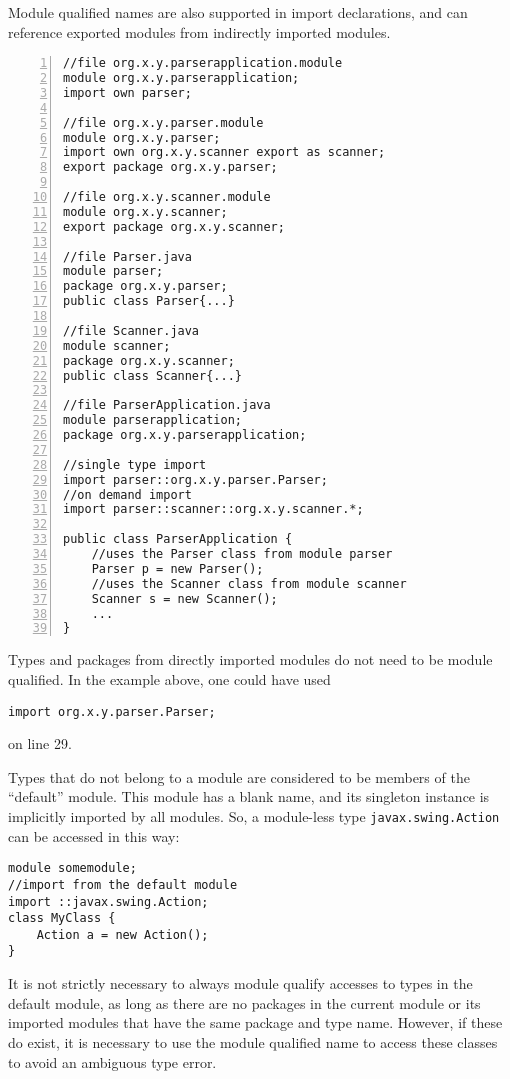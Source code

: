 Module qualified names are also supported in import declarations,
and can reference exported modules from indirectly imported modules.

\begin{lstlisting}[caption=Module Qualified Imports,numbers=left]
//file org.x.y.parserapplication.module
module org.x.y.parserapplication;
import own parser;

//file org.x.y.parser.module
module org.x.y.parser;
import own org.x.y.scanner export as scanner;
export package org.x.y.parser;

//file org.x.y.scanner.module
module org.x.y.scanner;
export package org.x.y.scanner;

//file Parser.java
module parser;
package org.x.y.parser;
public class Parser{...}

//file Scanner.java
module scanner;
package org.x.y.scanner;
public class Scanner{...}

//file ParserApplication.java
module parserapplication;
package org.x.y.parserapplication;

//single type import
import parser::org.x.y.parser.Parser;
//on demand import
import parser::scanner::org.x.y.scanner.*;

public class ParserApplication {
	//uses the Parser class from module parser
	Parser p = new Parser(); 
	//uses the Scanner class from module scanner
	Scanner s = new Scanner(); 
	...
}

\end{lstlisting}

Types and packages from directly imported modules do not need to
be module qualified. In the example above, one could have used
\begin{lstlisting}
import org.x.y.parser.Parser;
\end{lstlisting}
on line 29.

Types that do not belong to a module are considered to be members of
the ``default'' module. This module has a blank name, and its singleton
instance is implicitly imported by all modules. So, a module-less
type {\tt javax.swing.Action} can be accessed in this way:

\begin{lstlisting}[caption=Default Module Lookups]
module somemodule;
//import from the default module
import ::javax.swing.Action;
class MyClass {
	Action a = new Action();
}
\end{lstlisting}

It is not strictly necessary to always module qualify accesses to types in
the default module, as long as there are no packages in the current module
or its imported modules that have the same package and type name. However,
if these do exist, it is necessary to use the module qualified name to access
these classes to avoid an ambiguous type error.

